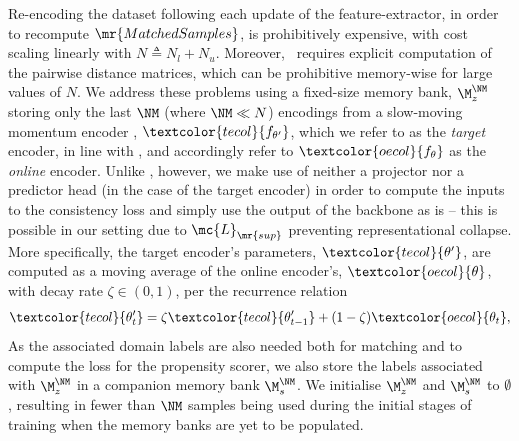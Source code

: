 Re-encoding the dataset following each update of the feature-extractor, in order to recompute
$\mr{MatchedSamples}$, is prohibitively expensive, with cost scaling linearly with $N \triangleq
N_l + N_u$.
%
Moreover, \CNN \ requires explicit computation of the pairwise distance matrices, which can be
prohibitive memory-wise for large values of $N$.
%
We address these problems using a fixed-size memory bank, $\M^{\NM}_z$ storing only the last $\NM$
(where $\NM \ll N$) encodings from a slow-moving momentum encoder \citep{grill2020bootstrap,
he2020momentum}, $\textcolor{tecol}{f_{\theta^\prime}}$, which we refer to as the
\textcolor{tecol}{\emph{target}} encoder, in line with \cite{grill2020bootstrap}, and accordingly
refer to $\textcolor{oecol}{f_\theta}$ as the \textcolor{oecol}{\emph{online}} encoder.
%
Unlike \cite{grill2020bootstrap}, however, we make use of neither a projector nor a predictor head
(in the case of the target encoder) in order to compute the inputs to the consistency loss and
simply use the output of the backbone as is -- this is possible in our setting due to
$\mc{L}_\mr{sup}$ preventing representational collapse.
%
More specifically, the target encoder's parameters, $\textcolor{tecol}{\theta^\prime}$, are computed as a moving
average of the online encoder's, $\textcolor{oecol}{\theta}$, with decay rate $\zeta \in (0, 1)$, per the recurrence
relation
%
\begin{equation}
  \textcolor{tecol}{\theta^\prime_t} = \zeta \textcolor{tecol}{\theta^\prime_{t - 1}} + (1 - \zeta)
  \textcolor{oecol}{\theta_t},
\end{equation}
%
As the associated domain labels are also needed both for matching and to compute the loss for the
propensity scorer, we also store the labels associated with $\M^{\NM}_z$ in a companion memory bank
$\M^{\NM}_s$. 
%
We initialise $\M^{\NM}_z$ and $\M^{\NM}_s$ to $\emptyset$, resulting in
fewer than $\NM$ samples being used during the initial stages of training when the memory banks are
yet to be populated.
%

